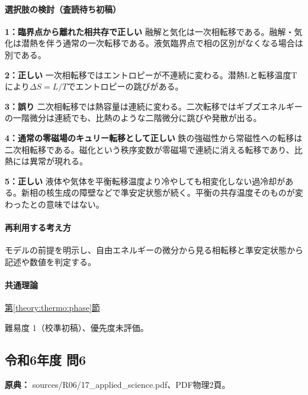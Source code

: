 \paragraph{選択肢の検討（査読待ち初稿）}\mbox{}\par

\noindent\textbf{1：臨界点から離れた相共存で正しい} 融解と気化は一次相転移である。融解・気化は潜熱を伴う通常の一次転移である。液気臨界点で相の区別がなくなる場合は別である。\par

\noindent\textbf{2：正しい} 一次相転移ではエントロピーが不連続に変わる。潜熱Lと転移温度Tにより\(\Delta S=L/T\)でエントロピーの跳びがある。\par

\noindent\textbf{3：誤り} 二次相転移では熱容量は連続に変わる。二次転移ではギブズエネルギーの一階微分は連続でも、比熱のような二階微分に跳びや発散が出る。\par

\noindent\textbf{4：通常の零磁場のキュリー転移として正しい} 鉄の強磁性から常磁性への転移は二次相転移である。磁化という秩序変数が零磁場で連続に消える転移であり、比熱には異常が現れる。\par

\noindent\textbf{5：正しい} 液体や気体を平衡転移温度より冷やしても相変化しない過冷却がある。新相の核生成の障壁などで準安定状態が続く。平衡の共存温度そのものが変わったとの意味ではない。\par

\paragraph{再利用する考え方} モデルの前提を明示し、自由エネルギーの微分から見る相転移と準安定状態から記述や数値を判定する。

\paragraph{共通理論} \hyperref[theory:thermo:phase]{第\ref*{theory:thermo:phase}節}

\par 難易度 1（校準初稿）、優先度未評価。

\subsection{令和6年度 問6}
\label{q:r06-reg-applied-06}

\noindent\textbf{原典：} sources/R06/17\_applied\_science.pdf、PDF物理2頁。

